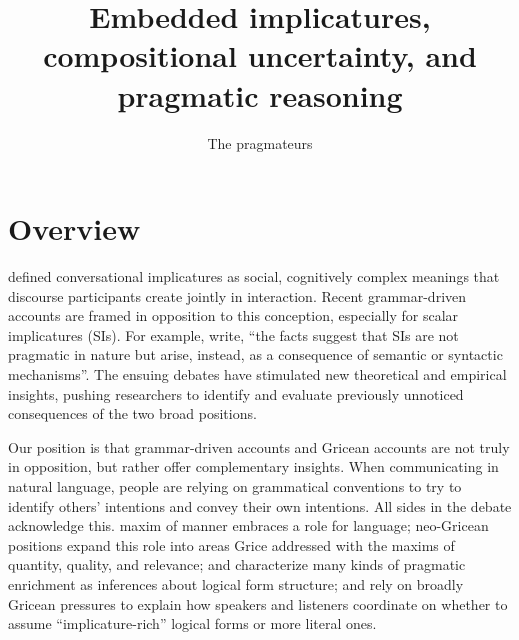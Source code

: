 \documentclass{article}
\begin{document}

\title{Embedded implicatures, compositional uncertainty, and pragmatic reasoning}
\author{The pragmateurs}
\maketitle


\section{Overview}\label{sec:introduction}

\citet{Grice75} defined conversational implicatures as social,
cognitively complex meanings that discourse participants create
jointly in interaction. Recent grammar-driven accounts are framed in
opposition to this conception, especially for scalar implicatures
(SIs).  For example, \citet{ChierchiaFoxSpector08} write, ``the facts
suggest that SIs are not pragmatic in nature but arise, instead, as a
consequence of semantic or syntactic mechanisms''. The ensuing debates
have stimulated new theoretical and empirical insights, pushing
researchers to identify and evaluate previously unnoticed consequences
of the two broad positions.

Our position is that grammar-driven accounts and Gricean accounts are
not truly in opposition, but rather offer complementary insights.
When communicating in natural language, people are relying on
grammatical conventions to try to identify others' intentions and
convey their own intentions. All sides in the debate acknowledge this.
 maxim of manner embraces a role for language;
neo-Gricean positions expand this role into areas Grice addressed with
the maxims of quantity, quality, and relevance; \citet{Sperber95} and
\citet{Bach94} characterize many kinds of pragmatic enrichment as
inferences about logical form structure; and
\citet{ChierchiaFoxSpector08} rely on broadly Gricean pressures to
explain how speakers and listeners coordinate on whether to assume
``implicature-rich'' logical forms or more literal ones.
\end{document}
